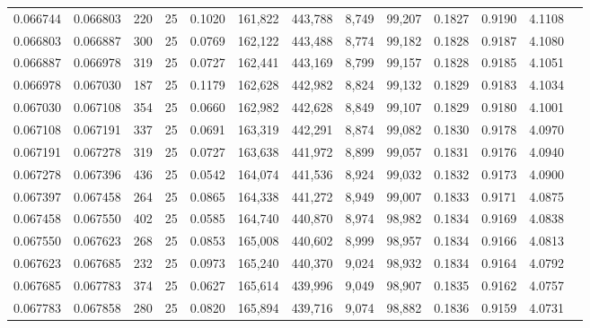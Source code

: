 \begin{tabular}{rrrrrrrrrrrrr}
0.066744 & 0.066803 &   220 &  25 &                                     0.1020 & 161,822 & 443,788 &   8,749 &  99,207 & 0.1827 & 0.9190 & 4.1108 \\
0.066803 & 0.066887 &   300 &  25 &                                     0.0769 & 162,122 & 443,488 &   8,774 &  99,182 & 0.1828 & 0.9187 & 4.1080 \\
0.066887 & 0.066978 &   319 &  25 &                                     0.0727 & 162,441 & 443,169 &   8,799 &  99,157 & 0.1828 & 0.9185 & 4.1051 \\
0.066978 & 0.067030 &   187 &  25 &                                     0.1179 & 162,628 & 442,982 &   8,824 &  99,132 & 0.1829 & 0.9183 & 4.1034 \\
0.067030 & 0.067108 &   354 &  25 &                                     0.0660 & 162,982 & 442,628 &   8,849 &  99,107 & 0.1829 & 0.9180 & 4.1001 \\
0.067108 & 0.067191 &   337 &  25 &                                     0.0691 & 163,319 & 442,291 &   8,874 &  99,082 & 0.1830 & 0.9178 & 4.0970 \\
0.067191 & 0.067278 &   319 &  25 &                                     0.0727 & 163,638 & 441,972 &   8,899 &  99,057 & 0.1831 & 0.9176 & 4.0940 \\
0.067278 & 0.067396 &   436 &  25 &                                     0.0542 & 164,074 & 441,536 &   8,924 &  99,032 & 0.1832 & 0.9173 & 4.0900 \\
0.067397 & 0.067458 &   264 &  25 &                                     0.0865 & 164,338 & 441,272 &   8,949 &  99,007 & 0.1833 & 0.9171 & 4.0875 \\
0.067458 & 0.067550 &   402 &  25 &                                     0.0585 & 164,740 & 440,870 &   8,974 &  98,982 & 0.1834 & 0.9169 & 4.0838 \\
0.067550 & 0.067623 &   268 &  25 &                                     0.0853 & 165,008 & 440,602 &   8,999 &  98,957 & 0.1834 & 0.9166 & 4.0813 \\
0.067623 & 0.067685 &   232 &  25 &                                     0.0973 & 165,240 & 440,370 &   9,024 &  98,932 & 0.1834 & 0.9164 & 4.0792 \\
0.067685 & 0.067783 &   374 &  25 &                                     0.0627 & 165,614 & 439,996 &   9,049 &  98,907 & 0.1835 & 0.9162 & 4.0757 \\
0.067783 & 0.067858 &   280 &  25 &                                     0.0820 & 165,894 & 439,716 &   9,074 &  98,882 & 0.1836 & 0.9159 & 4.0731 \\

\end{tabular}
